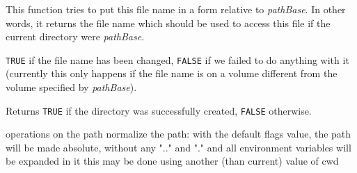 \label{wxfilenamemakerelativeto}


This function tries to put this file name in a form relative to {\it pathBase}.
In other words, it returns the file name which should be used to access this
file if the current directory were {\it pathBase}.




{\tt TRUE} if the file name has been changed, {\tt FALSE} if we failed to do
anything with it (currently this only happens if the file name is on a volume
different from the volume specified by {\it pathBase}).



\label{wxfilenamemkdir}







Returns {\tt TRUE} if the directory was successfully created, {\tt FALSE}
otherwise.

\label{wxfilenamenormalize}


operations on the path
normalize the path: with the default flags value, the path will be
made absolute, without any ".." and "." and all environment
variables will be expanded in it
this may be done using another (than current) value of cwd


